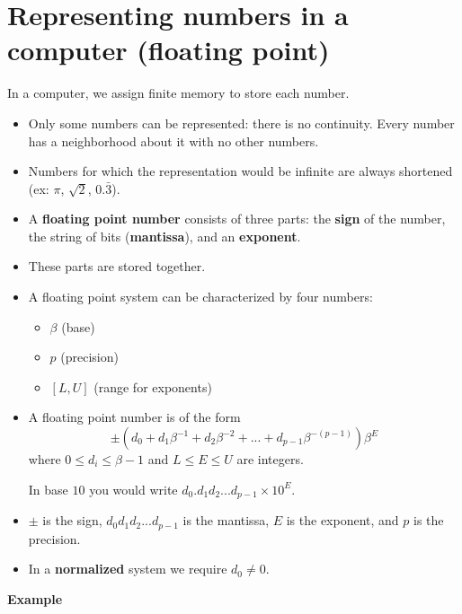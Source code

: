 \documentclass[12pt,letterpaper,noanswers]{exam}
\begin{document}
\section{Representing numbers in a computer (floating point)}

In a computer, we assign finite memory to store each number.  
\begin{itemize}
\itemsep0pt
    \item Only some numbers can be represented: there is no continuity.  Every number has a neighborhood about it with no other numbers.
    \item Numbers for which the representation would be infinite are always shortened (ex: $\pi$, $\sqrt{2}$, $0.\bar{3}$).
\end{itemize}

\begin{tcolorbox}
\begin{itemize}
\itemsep0pt
    \item A \textbf{floating point number} consists of three parts: the \textbf{sign} of the number, the string of bits (\textbf{mantissa}), and an \textbf{exponent}.  \cite{sauer2018numerical}
    \item These parts are stored together.
    \item A floating point system can be characterized by four numbers:
\begin{itemize}
\itemsep0pt
    \item $\beta$ (base)
    \item $p$ (precision)
    \item $[L,U]$ (range for exponents)
\end{itemize}

\item A floating point number is of the form \[ \pm \left(d_0 + d_1\beta^{-1} + d_2 \beta^{-2} + ... + d_{p-1}\beta^{-(p-1)}\right) \beta^E\] where $0\leq d_i\leq \beta-1$ and $L\leq E \leq U$ are integers.

In base $10$ you would write $d_0.d_1d_2...d_{p-1} \times 10^E$.
\item $\pm$ is the sign, $d_0d_1d_2...d_{p-1}$ is the mantissa, $E$ is the exponent, and $p$ is the precision.
\item In a \textbf{normalized} system we require $d_0\neq 0$.
\end{itemize}

\end{tcolorbox}

\noindent\textbf{Example} 
\end{document}
